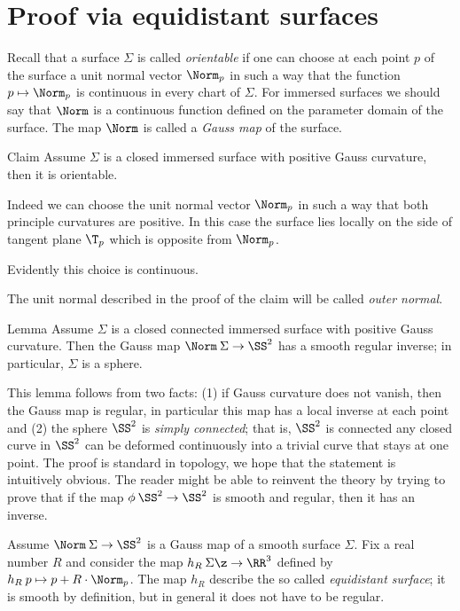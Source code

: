 \section*{Proof via equidistant surfaces}

Recall that a surface $\Sigma$ is called \emph{orientable} if one can choose at each point $p$ of the surface
a unit normal vector $\Norm_p$  in such a way that the function $p\mapsto \Norm_p$ is continuous in every chart of $\Sigma$.
For immersed surfaces we should say that $\Norm$ is a continuous function defined on the parameter domain of the surface.
The map $\Norm$ is called a \emph{Gauss map} of the surface.

\begin{thm}{Claim}
Assume $\Sigma$ is a closed immersed surface with positive Gauss curvature, then it is orientable.
\end{thm}


 Indeed we can choose the unit normal vector $\Norm_p$ in such a way that both principle curvatures are positive. 
In this case the surface lies locally on the side of tangent plane $\T_p$ which is opposite from $\Norm_p$.

Evidently this choice is  continuous.
\qeds

The unit normal described in the proof of the claim will be called \emph{outer normal}.

\begin{thm}{Lemma}\label{lem:gauss-inverse}
Assume $\Sigma$ is a closed connected immersed surface with positive Gauss curvature.
Then the Gauss map $\Norm\:\Sigma \to \SS^2$ has a smooth regular inverse;
in particular, $\Sigma$ is a sphere.
\end{thm}

This lemma follows from two facts:
(1) if Gauss curvature does not vanish, then the  Gauss map is regular, in particular this map has a local inverse at each point
and
(2) the sphere $\SS^2$ is \emph{simply connected};
that is, $\SS^2$ is connected any closed curve in $\SS^2$ can be deformed continuously into a trivial curve that stays at one point.
The proof is standard in topology, we hope that the statement is intuitively obvious.
The reader might be able to reinvent the theory by trying to prove that if the map $\phi\:\SS^2\to\SS^2$ is smooth and regular, then it has an inverse.

Assume $\Norm\:\Sigma\to \SS^2$ is a Gauss map of a smooth surface $\Sigma$.
Fix a real number $R$ and consider the map $h_R\:\Sigma\z\to\RR^3$ defined by $h_R\:p\mapsto p+R\cdot\Norm_p$.
The map $h_R$ describe the so called \emph{equidistant surface};
it is smooth by definition, but in general it does not have to be regular.

